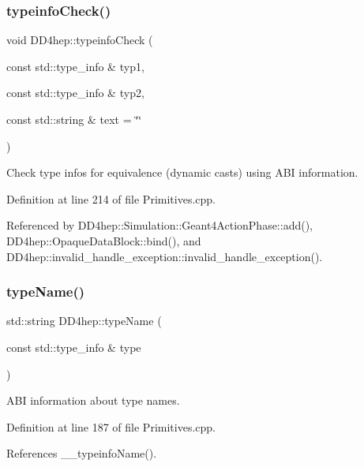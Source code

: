 \subsubsection{\texorpdfstring{typeinfo\+Check()}{typeinfoCheck()}}
{\footnotesize\ttfamily void D\+D4hep\+::typeinfo\+Check (\begin{DoxyParamCaption}\item[{const std\+::type\+\_\+info \&}]{typ1,  }\item[{const std\+::type\+\_\+info \&}]{typ2,  }\item[{const std\+::string \&}]{text = {\ttfamily \char`\"{}\char`\"{}} }\end{DoxyParamCaption})}



Check type infos for equivalence (dynamic casts) using A\+BI information. 



Definition at line 214 of file Primitives.\+cpp.



Referenced by D\+D4hep\+::\+Simulation\+::\+Geant4\+Action\+Phase\+::add(), D\+D4hep\+::\+Opaque\+Data\+Block\+::bind(), and D\+D4hep\+::invalid\+\_\+handle\+\_\+exception\+::invalid\+\_\+handle\+\_\+exception().

\hypertarget{namespace_d_d4hep_aac3aec612736d0521670ca2e7b1305bd}{}\label{namespace_d_d4hep_aac3aec612736d0521670ca2e7b1305bd} 
\subsubsection{\texorpdfstring{type\+Name()}{typeName()}}
{\footnotesize\ttfamily std\+::string D\+D4hep\+::type\+Name (\begin{DoxyParamCaption}\item[{const std\+::type\+\_\+info \&}]{type }\end{DoxyParamCaption})}



A\+BI information about type names. 



Definition at line 187 of file Primitives.\+cpp.



References \+\_\+\+\_\+typeinfo\+Name().



